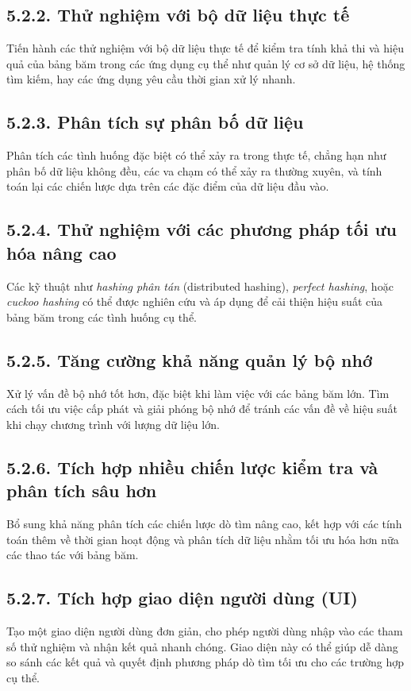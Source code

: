 \documentclass[12pt,a4paper]{report}
\begin{document}
    \subsection*{5.2.2. Thử nghiệm với bộ dữ liệu thực tế}
        \noindent \indent Tiến hành các thử nghiệm với bộ dữ liệu thực tế để kiểm tra tính khả thi và hiệu quả của bảng băm trong các ứng dụng cụ thể như quản lý cơ sở dữ liệu, hệ thống tìm kiếm, hay các ứng dụng yêu cầu thời gian xử lý nhanh.
    
    \subsection*{5.2.3. Phân tích sự phân bố dữ liệu}
        \noindent \indent Phân tích các tình huống đặc biệt có thể xảy ra trong thực tế, chẳng hạn như phân bố dữ liệu không đều, các va chạm có thể xảy ra thường xuyên, và tính toán lại các chiến lược dựa trên các đặc điểm của dữ liệu đầu vào.
    
    \subsection*{5.2.4. Thử nghiệm với các phương pháp tối ưu hóa nâng cao}
    \noindent \indent Các kỹ thuật như \textit{hashing phân tán} (distributed hashing), \textit{perfect hashing}, hoặc \textit{cuckoo hashing} có thể được nghiên cứu và áp dụng để cải thiện hiệu suất của bảng băm trong các tình huống cụ thể.
    
    \subsection*{5.2.5. Tăng cường khả năng quản lý bộ nhớ}
        \noindent \indent Xử lý vấn đề bộ nhớ tốt hơn, đặc biệt khi làm việc với các bảng băm lớn. Tìm cách tối ưu việc cấp phát và giải phóng bộ nhớ để tránh các vấn đề về hiệu suất khi chạy chương trình với lượng dữ liệu lớn.
    
    \subsection*{5.2.6. Tích hợp nhiều chiến lược kiểm tra và phân tích sâu hơn}
        \noindent \indent Bổ sung khả năng phân tích các chiến lược dò tìm nâng cao, kết hợp với các tính toán thêm về thời gian hoạt động và phân tích dữ liệu nhằm tối ưu hóa hơn nữa các thao tác với bảng băm.
    
    \subsection*{5.2.7. Tích hợp giao diện người dùng (UI)}
        \noindent \indent Tạo một giao diện người dùng đơn giản, cho phép người dùng nhập vào các tham số thử nghiệm và nhận kết quả nhanh chóng. Giao diện này có thể giúp dễ dàng so sánh các kết quả và quyết định phương pháp dò tìm tối ưu cho các trường hợp cụ thể.
\end{document}
